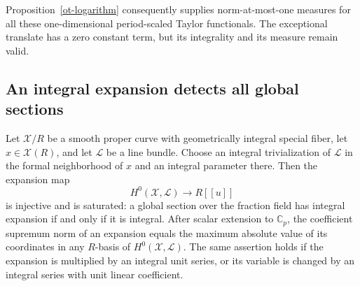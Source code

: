 Proposition~\ref{ot-logarithm} consequently supplies norm-at-most-one
measures for all these one-dimensional period-scaled Taylor
functionals.  The exceptional translate has a zero constant term,
but its integrality and its measure remain valid.

\subsection{An integral expansion detects all global sections}

\begin{lemma}\label{ct-expansion-saturated}
Let $\mathscr X/R$ be a smooth proper curve with geometrically
integral special fiber, let $x\in\mathscr X(R)$, and let
$\mathscr L$ be a line bundle.  Choose an integral trivialization
of $\mathscr L$ in the formal neighborhood of $x$ and an integral
parameter there.  Then the expansion map
\[
 H^0(\mathscr X,\mathscr L)\longrightarrow R[[u]]
 \tag{CT14}
\]
is injective and is saturated: a global section over the fraction
field has integral expansion if and only if it is integral.
After scalar extension to $\mathbb C_p$, the coefficient
supremum norm of an expansion equals the maximum absolute value
of its coordinates in any $R$-basis of $H^0(\mathscr X,\mathscr L)$.
The same assertion holds if the expansion is multiplied by an
integral unit series, or its variable is changed by an integral
series with unit linear coefficient.
\end{lemma}
